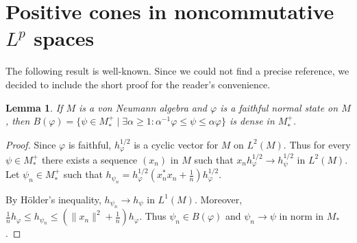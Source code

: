 \documentclass[12pt,a4paper]{amsart}
\newcommand{\1}{\mathds{1}}
\renewcommand{\phi}{\varphi}
\renewcommand{\H}{\mathcal H}
\renewcommand{\L}{\mathcal L}
\newcommand{\norm}[1]{\lVert#1\rVert}
\theoremstyle{plain}
\newtheorem{lemma}[proposition]{Lemma}
\theoremstyle{definition}
\theoremstyle{remark}
\begin{document}

\appendix
\section{Positive cones in noncommutative \texorpdfstring{$L^p$}{Lp} spaces}

The following result is well-known. Since we could not find a precise reference, we decided to include the short proof for the reader's convenience.

\begin{lemma}\label{lem:dense_pos_cone_Lp}
If $M$ is a von Neumann algebra and $\phi$ is a faithful normal state on $M$, then $B(\phi)=\{\psi\in M_\ast^+\mid\exists \alpha\geq 1\colon \alpha^{-1}\phi\leq \psi\leq\alpha \phi\}$ is dense in $M_\ast^+$.
\end{lemma}
\begin{proof}
Since $\phi$ is faithful, $h_\phi^{1/2}$ is a cyclic vector for $M$ on $L^2(M)$. Thus for every $\psi\in M_\ast^+$ there exists a sequence $(x_n)$ in $M$ such that $x_n h_\phi^{1/2}\to h_\psi^{1/2}$ in $L^2(M)$. Let $\psi_n\in M_\ast^+$ such that $h_{\psi_n}=h_\phi^{1/2}(x_n^\ast x_n+\frac 1 n)h_\phi^{1/2}$.

By Hölder's inequality, $h_{\psi_n}\to h_\psi$ in $L^1(M)$. Moreover, $\frac 1n h_\phi\leq h_{\psi_n}\leq (\norm{x_n}^2+\frac 1 n)h_\phi$. Thus $\psi_n\in B(\phi)$ and $\psi_n\to \psi$ in norm in $M_\ast$.
\end{proof}
\end{document}
